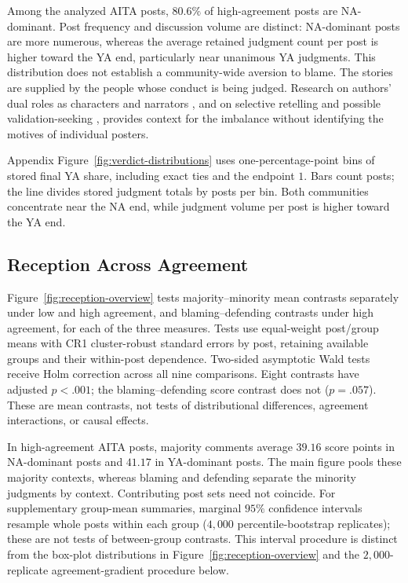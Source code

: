 Among the analyzed AITA posts, $80.6\%$ of high-agreement posts are NA-dominant.
Post frequency and discussion volume are distinct: NA-dominant posts
are more numerous, whereas the average retained judgment count per post
is higher toward the YA end, particularly near unanimous YA judgments.
This distribution does not establish a community-wide aversion to blame.
The stories are supplied by the people whose conduct is being judged.
Research on authors' dual roles as characters and narrators
\cite{giorgi2023author}, and on selective retelling and possible
validation-seeking \cite{haworth2021reasonability}, provides context for
the imbalance without identifying the motives of individual posters.

Appendix Figure~\ref{fig:verdict-distributions} uses one-percentage-point
bins of stored final YA share, including exact ties and the endpoint $1$.
Bars count posts; the line divides stored judgment totals by posts per bin.
Both communities concentrate near the NA end, while judgment volume per post
is higher toward the YA end.

\subsection{Reception Across Agreement}
\label{sec:supp-reception-analysis}

Figure~\ref{fig:reception-overview} tests majority--minority mean
contrasts separately under low and high agreement, and blaming--defending
contrasts under high agreement, for each of the three measures. Tests use
equal-weight post/group means with CR1 cluster-robust standard errors by
post, retaining available groups and their within-post dependence.
Two-sided asymptotic Wald tests receive Holm correction across all nine
comparisons. Eight contrasts have adjusted $p<.001$; the blaming--defending
score contrast does not ($p=.057$). These are mean contrasts, not tests of
distributional differences, agreement interactions, or causal effects.

In high-agreement AITA posts, majority comments average $39.16$ score points
in NA-dominant posts and $41.17$ in YA-dominant posts. The main figure pools
these majority contexts, whereas blaming and defending separate the
minority judgments by context. Contributing post sets need not coincide.
For supplementary group-mean summaries, marginal
$95\%$ confidence intervals resample whole posts within each group
($4{,}000$ percentile-bootstrap replicates); these are not tests of
between-group contrasts. This interval procedure is distinct from the
box-plot distributions in Figure~\ref{fig:reception-overview} and the
$2{,}000$-replicate agreement-gradient procedure below.

